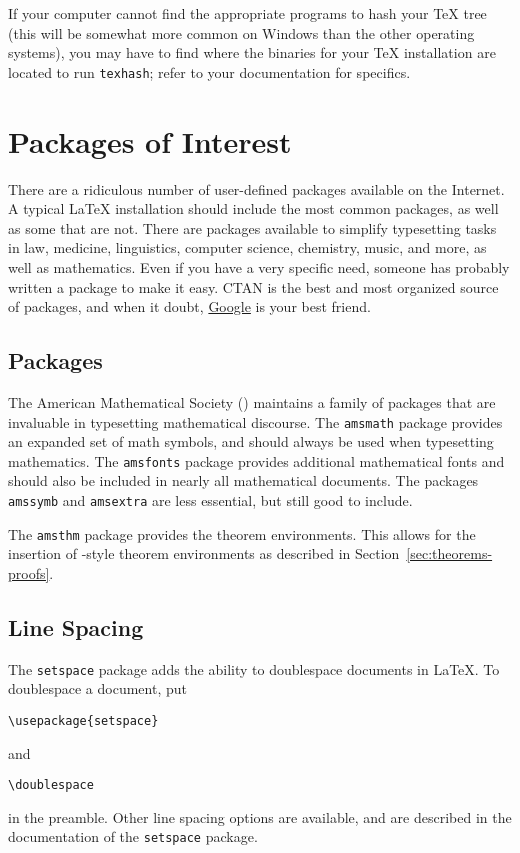 If your computer cannot find the appropriate programs to hash your
\TeX{} tree (this will be somewhat more common on Windows than the
other operating systems), you may have to find where the binaries for
your \TeX{} installation are located to run \texttt{texhash}; refer to
your documentation for specifics.

\section{Packages of Interest}
\label{sec:packages-interest}

There are a ridiculous number of user-defined packages available on
the Internet.  A typical \LaTeX{} installation should include the most
common packages, as well as some that are not.  There are packages
available to simplify typesetting tasks in law, medicine, linguistics,
computer science, chemistry, music, and more, as well as mathematics.
Even if you have a very specific need, someone has probably written a
package to make it easy.  CTAN is the best and most organized source
of packages, and when it doubt, \href{http://www.google.com}{Google}
is your best friend.

\subsection{\AmS{} Packages}
\label{sec:ams-packages}

The American Mathematical Society (\AmS) maintains a family of
packages that are invaluable in typesetting mathematical discourse.
The \texttt{amsmath} package provides an expanded set of math symbols,
and should always be used when typesetting mathematics.  The
\texttt{amsfonts} package provides additional mathematical fonts and
should also be included in nearly all mathematical documents.  The
packages \texttt{amssymb} and \texttt{amsextra} are less essential,
but still good to include.

The \texttt{amsthm} package provides the \AmS{} theorem environments.
This allows for the insertion of \AmS-style theorem environments as
described in Section~\ref{sec:theorems-proofs}.

\subsection{Line Spacing}
\label{sec:line-spacing}

The \texttt{setspace} package adds the ability to doublespace
documents in \LaTeX{}.  To doublespace a document, put
\begin{verbatim}
\usepackage{setspace}
\end{verbatim}
and
\begin{verbatim}
\doublespace
\end{verbatim}
in the preamble.  Other line spacing options are available, and are
described in the documentation of the \texttt{setspace} package.

